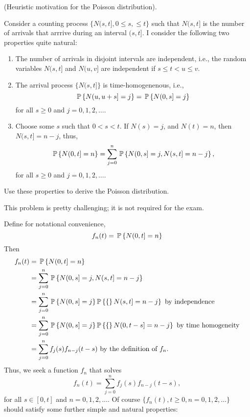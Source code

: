 \begin{question}[use=false]
 (Heuristic motivation for the Poisson distribution).  

 Consider a counting process $\{N(s,t], 0\leq s, \leq t\}$ such that
 $N(s,t]$ is the number of arrivals that arrrive during an interval
 $(s,t]$. I consider the following two properties quite natural:
 \begin{enumerate}
 \item The number of arrivals in disjoint intervals are independent,
   i.e., the random variables $N(s,t]$ and $N(u,v]$ are
   independent if $s\leq t < u \leq v$. 
 \item The arrival process $\{N(s,t]\}$ is time-homogenenous, i.e.,
   \begin{equation*}
   \P{N(u,u+s] = j} = \P{N(0,s] = j}
   \end{equation*}
 for all $s\geq 0$ and $j=0,1,2,\ldots$. 
\item Choose some $s$ such that $0<s<t$. If $N(s)=j$, and $N(t) = n$, then $N(s,t] = n-j$, thus,
  \begin{equation*}
    \P{N(0,t]=n} = \sum_{j=0}^n \P{N(0,s] = j, N(s,t] = n-j},
  \end{equation*}
 for all $s\geq 0$ and $j=0,1,2,\ldots$. 
 \end{enumerate}
Use these properties to derive the Poisson distribution.  

 \begin{solution}
This problem is pretty challenging; it is not required for the exam.

Define for notational convenience, 
 \begin{equation*}
   f_n(t) = \P{N(0,t] = n}
 \end{equation*}
Then
\begin{equation*}
  \begin{split}
   f_n(t) &= \P{N(0,t] = n} \\
   &= \sum_{j=0}^n \P{N(0,s] = j, N(s,t] = n-j} \\ 
   &= \sum_{j=0}^n \P{N(0,s] = j\} \P\{N(s,t] = n-j} \text{ by independence}\\ 
   &= \sum_{j=0}^n \P{N(0,s] = j\} \P\{N(0,t-s] = n-j} \text{ by time homogeneity}\\ 
   &= \sum_{j=0}^n f_j(s) f_{n-j}(t-s) \text{ by the definition of } f_n.
  \end{split}
\end{equation*}
Thus, we seek a function $f_n$  that solves
\begin{equation*}
   f_n(t) = \sum_{j=0}^n f_j(s) f_{n-j}(t-s),  \tag{*}
\end{equation*}
for all $s\in[0,t]$ and $n=0,1,2,\ldots$.  Of course
$\{f_n(t), t\geq 0, n=0,1,2,\ldots\}$ should satisfy some
further simple and natural properties:


\end{solution}
\end{question}

